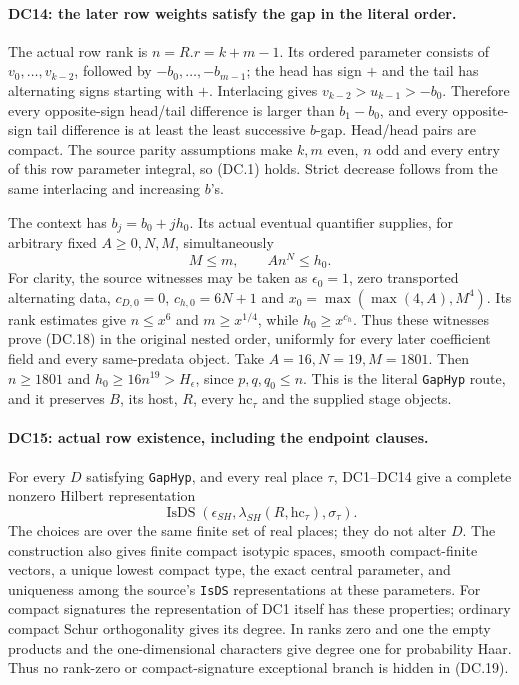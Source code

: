 \paragraph{DC14: the later row weights satisfy the gap in the literal order.}
\label{claim:DC14}
The actual row rank is $n=R.r=k+m-1$.  Its ordered parameter consists
of $v_0,\ldots,v_{k-2}$, followed by $-b_0,\ldots,-b_{m-1}$;
the head has sign $+$ and the tail has alternating signs starting
with $+$.  Interlacing gives $v_{k-2}>u_{k-1}>-b_0$.
Therefore every opposite-sign head/tail difference is larger than
$b_1-b_0$, and every opposite-sign tail difference is at least the
least successive $b$-gap.  Head/head pairs are compact.
The source parity assumptions make $k,m$ even, $n$ odd and every
entry of this row parameter integral, so (DC.1) holds.  Strict
decrease follows from the same interlacing and increasing $b$'s.

The context has $b_j=b_0+jh_0$.  Its actual eventual quantifier
supplies, for arbitrary fixed $A\ge0,N,M$, simultaneously
\[
                   M\le m,\qquad A n^N\le h_0.                \tag{DC.18}
\]
For clarity, the source witnesses may be taken as $\epsilon_0=1$,
zero transported alternating data, $c_{D,0}=0$, $c_{h,0}=6N+1$ and
$x_0=\max(\max(4,A),M^4)$.  Its rank estimates give $n\le x^6$
and $m\ge x^{1/4}$, while $h_0\ge x^{c_h}$.  Thus these witnesses
prove (DC.18) in the original nested order, uniformly for every
later coefficient field and every same-predata object.
Take $A=16,N=19,M=1801$.  Then $n\ge1801$ and
$h_0\ge16n^{19}>H_\epsilon$, since $p,q,q_0\le n$.
This is the literal \texttt{GapHyp} route, and it preserves $B$, its
host, $R$, every $\mathrm{hc}_\tau$ and the supplied stage objects.

\paragraph{DC15: actual row existence, including the endpoint clauses.}
\label{claim:DC15}
For every $D$ satisfying \texttt{GapHyp}, and every real place $\tau$,
DC1--DC14 give a complete nonzero Hilbert representation
\[
             \operatorname{IsDS}(\epsilon_{SH},
                                  \lambda_{SH}(R,\mathrm{hc}_\tau),\sigma_\tau).
                                                                  \tag{DC.19}
\]
The choices are over the same finite set of real places; they do not
alter $D$.  The construction also gives finite compact isotypic
spaces, smooth compact-finite vectors, a unique lowest compact type,
the exact central parameter, and uniqueness among the source's
\texttt{IsDS} representations at these parameters.  For compact
signatures the representation of DC1 itself has these properties;
ordinary compact Schur orthogonality gives its degree.  In ranks
zero and one the empty products and the one-dimensional characters
give degree one for probability Haar.  Thus no rank-zero or
compact-signature exceptional branch is hidden in (DC.19).

